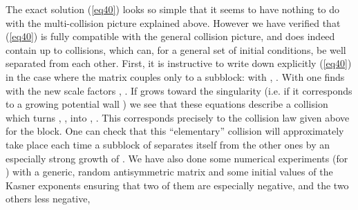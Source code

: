 \documentclass[a4paper,12pt]{article}
\begin{document}
The exact solution (\ref{eq40}) looks so simple that it seems to have 
nothing to do with the multi-collision picture explained above. However 
we have verified that (\ref{eq40}) is fully compatible with the general 
collision picture, and does indeed contain up to \myHighlight{$[d/2]$}\coordHE{} collisions, 
which can, for a general set of initial conditions, be well separated 
from each other. First, it is instructive to write down explicitly 
(\ref{eq40}) in the case where the matrix \coordHE{} couples only to a \coordHE{} subblock: \coordHE{} with \coordHE{}, \coordHE{}. With \coordHE{} one finds \coordHE{} with the new scale factors
\coordHE{},
\coordHE{}.
If \coordHE{} grows toward the singularity 
(i.e. if it corresponds to a growing potential wall \coordHE{}) we see that 
these equations describe a collision which turns \coordHE{}, \coordHE{}, into \coordHE{}, \coordHE{}. This corresponds precisely to the collision
law given above for the 
\coordHE{} block. One can check that this ``elementary'' collision will 
approximately take place each time a \coordHE{} subblock of \coordHE{} 
separates itself from the other ones by an especially strong growth of 
\coordHE{}. We have also done some numerical 
experiments (for \coordHE{}) with a generic, random antisymmetric matrix \coordHE{} 
and some initial values of the Kasner exponents \coordHE{} ensuring that 
two of them are especially negative, and the two others less negative, 
\end{document}
